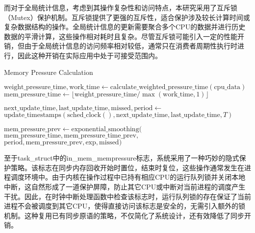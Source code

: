 而对于全局统计信息，考虑到其操作复杂性和访问特点，本研究采用了互斥锁（Mutex）保护机制。互斥锁提供了更强的互斥性，适合保护涉及较长计算时间或复杂数据结构的操作。全局统计信息的更新需要聚合多个CPU的数据并进行历史数据的平滑计算，这些操作相对耗时且复杂。尽管互斥锁可能引入一定的性能开销，但由于全局统计信息的访问频率相对较低，通常只在消费者周期性执行时进行，因此这种开销在实际应用中处于可接受范围内。
\begin{algorithm}[htbp]
    \caption{Memory Pressure Calculation}
    \label{alg:mem_pressure_optimized}
    \SetAlgoLined
    \DontPrintSemicolon


    \BlankLine

    \(\text{weight\_pressure\_time}, \text{work\_time} \gets \text{calculate\_weighted\_pressure\_time}(\text{cpu\_data})\)\;
    \(\text{mem\_pressure\_time} \gets \lfloor \text{weight\_pressure\_time}/\max(\text{work\_time},1)\rfloor\)\;

    \(\text{next\_update\_time}, \text{last\_update\_time}, \text{missed}, \text{period} \gets\) \(\text{update\_timestamps}(\text{sched\_clock}(), \text{next\_update\_time}, \text{last\_update\_time}, T)\)\;

    \(\text{mem\_pressure\_prev} \gets \text{exponential\_smoothing}(\)
    \qquad \(\text{mem\_pressure\_time}, \text{mem\_pressure\_time\_prev},\)
    \qquad \(\text{period}, \text{mem\_pressure\_prev}, \text{exp}, \text{missed})\)\;
\end{algorithm}
至于task\_struct中的in\_mem\_mempressure标志，系统采用了一种巧妙的隐式保护策略。该标志在同步内存回收开始时置位，结束时复位，这些操作通常发生在进程调度环境中。由于内核在操作过程中已持有相应CPU的运行队列锁并关闭本地中断，这自然形成了一道保护屏障，防止其它CPU或中断对当前进程的调度产生干扰。因此，在时钟中断处理函数中检查该标志时，运行队列锁的存在保证了当前进程不会被调度到其它CPU，使得直接访问该标志是安全的，无需引入额外的锁机制。这种复用已有同步原语的策略，不仅简化了系统设计，还有效降低了同步开销。

